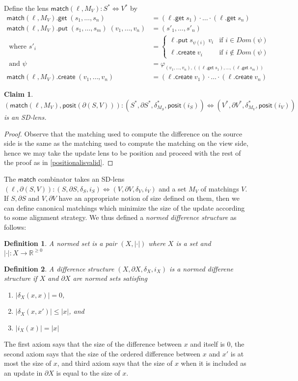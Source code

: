 \documentclass[acmsmall,review,anonymous]{acmart}\settopmatter{printfolios=true,printccs=false,printacmref=false}
\newtheorem{definition}{Definition}
\newtheorem{claim}{Claim}
\newcommand{\kw}[1]{\ensuremath{\mathsf{#1}}\xspace}
\newcommand{\get}{\ensuremath{\kw{get}}\xspace}
\newcommand{\pput}{\ensuremath{\kw{put}}\xspace}
\newcommand{\create}{\ensuremath{\kw{create}}\xspace}
\newcommand{\pos}{\ensuremath{\kw{posit}}\xspace}
\newcommand{\match}{\ensuremath{\kw{match}}\xspace}
\begin{document}
Define the lens $\match(\ell, M_V) : S^* \Leftrightarrow V^*$ by
\begin{align*}
\match(\ell, M_V) .\get \; (s_1, \ldots, s_n) &= (\ell.\get \; s_1) \cdot
\ldots \cdot (\ell.\get \; s_n)\\
\match(\ell, M_V) .\pput \; (s_1, \ldots, s_m) \; (v_1, \ldots, v_n) &= (s'_1
, \ldots , s'_n)\\
\text{ where } s'_i &= \begin{cases}
\ell.\pput \; s_{\psi(i)} \; v_i & \text{if } i \in Dom(\psi)\\
\ell.\create \; v_i & \text{if } i \not \in Dom(\psi)
\end{cases}\\
\text{ and } \psi &= \varphi_{(v_1, \ldots, v_n), ((\ell.\get \; s_1), \ldots,
(\ell.\get \; s_m))}\\
\match(\ell, M_V).\create \; (v_1, \ldots, v_n) &= (\ell.\create \; v_1) \cdot
\ldots \cdot (\ell.\create \; v_n)
\end{align*}
\begin{claim}
$(\match(\ell, M_V), \pos(\partial (S, V))) : (S^*, \partial S^*, \delta^*_{M_S},
\pos(i_{S})) \Leftrightarrow (V^*, \partial V^*, \delta^*_{M_V}, \pos(i_{V}))$
is an SD-lens.
\end{claim}
\begin{proof}
Observe that the matching used to compute the difference on the source side is
the same as the matching used to compute the matching on the view side, hence we
may take the update lens to be position and proceed with the rest of the proof
as in \cref{positionalisvalid}.
\end{proof}
The \match combinator takes an SD-lens $(\ell, \partial (S, V)) : (S, \partial
S, \delta_{S}, i_{S}) \Leftrightarrow (V, \partial V, \delta_{V}, i_{V})$ and a
set $M_V$ of matchings $V$. If $S, \partial S$ and $V, \partial V$ have an
appropriate notion of size defined on them, then we can define canonical
matchings which minimize the size of the update according to some alignment
strategy. We thus defined a {\em normed difference structure} as follows:
\begin{definition}
A normed set is a pair $(X, |\cdot|)$ where $X$ is a set and $|\cdot| : X
\longrightarrow \mathbb{R}^{\geq 0}$
\end{definition}
\begin{definition}
A difference structure $(X, \partial X, \delta_X, i_X)$ is a normed differene
structure if $X$ and $\partial X$ are normed sets satisfing
\begin{enumerate}
  \item
  $|\delta_X(x, x)| = 0$,
  \item
  $|\delta_X(x, x')| \leq |x|$, and
  \item
  $|i_X(x)| = |x|$
\end{enumerate}
\end{definition}
The first axiom says that the size of the difference between $x$ and itself is
0, the second axiom says that the size of the ordered difference between $x$
and $x'$ is at most the size of $x$, and third axiom says that the size of $x$
when it is included as an update in $\partial X$ is equal to the size of $x$.
\end{document}

